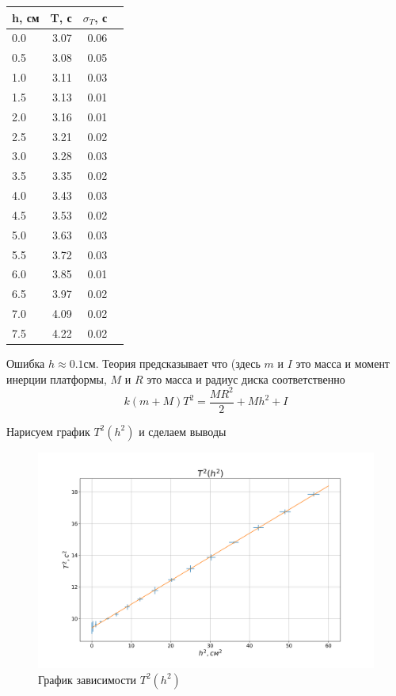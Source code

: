 \documentclass[a4paper, 12pt]{article}
\begin{document}
    \begin{table}[h!]
    \begin{center}
    \begin{tabular}{|l|r|r|r|}
    \hline
    h, см   &  T, с & $\sigma_T$, с\\
    \hline
    0.0 &  3.07 &  0.06 \\
    0.5 &  3.08 &  0.05 \\
    1.0 &  3.11 &  0.03 \\
    1.5 &  3.13 &  0.01 \\
    2.0 &  3.16 &  0.01 \\
    2.5 &  3.21 &  0.02 \\
    3.0 &  3.28 &  0.03 \\
    3.5 &  3.35 &  0.02 \\
    4.0 &  3.43 &  0.03 \\
    4.5 &  3.53 &  0.02 \\
    5.0 &  3.63 &  0.03 \\
    5.5 &  3.72 &  0.03 \\
    6.0 &  3.85 &  0.01 \\
    6.5 &  3.97 &  0.02 \\
    7.0 &  4.09 &  0.02 \\
    7.5 &  4.22 &  0.02 \\
    \hline
    \end{tabular}
    \end{center}
    \end{table}
    Ошибка $h \approx 0.1 см$. Теория предсказывает что (здесь $m$ и $I$ это масса и момент инерции платформы, $M$ и $R$ это масса и радиус диска соответственно
    \begin{equation}
        k(m+M)T^2=\frac{MR^2}{2}+Mh^2+I
    \end{equation}

    Нарисуем график $T^2(h^2)$ и сделаем выводы
    \newpage
    \begin{figure}
        \includegraphics[scale=0.66]{plot.png}
        \caption{График зависимости $T^2(h^2)$}
    \end{figure}
    \newpage
\end{document}
